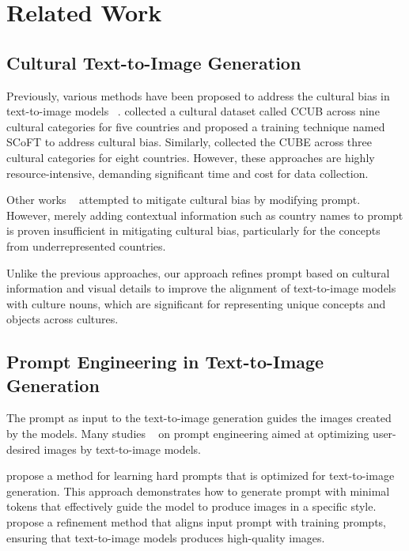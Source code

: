 \section{Related Work}
\subsection{Cultural Text-to-Image Generation}
Previously, various methods have been proposed to address the cultural bias in text-to-image models ~\citep{cho2023dall,friedrich2023fair,luccioni2024stable}. \citet{liu2024scoft} collected a cultural dataset called CCUB across nine cultural categories for five countries and proposed a training technique named SCoFT to address cultural bias. Similarly, \citet{kannen2024beyond} collected the CUBE across three cultural categories for eight countries. However, these approaches are highly resource-intensive, demanding significant time and cost for data collection.

Other works ~\citep{basu2023inspecting,bansal2022well} attempted to mitigate cultural bias by modifying prompt. However, merely adding contextual information such as country names to prompt is proven insufficient in mitigating cultural bias, particularly for the concepts from underrepresented countries.

Unlike the previous approaches, our approach refines prompt based on cultural information and visual details to improve the alignment of text-to-image models with culture nouns, which are significant for representing unique concepts and objects across cultures.

\subsection{Prompt Engineering in Text-to-Image Generation}
The prompt as input to the text-to-image generation guides the images created by the models. Many studies ~\citep{oppenlaender2023taxonomy,liu2022design,brade2023promptify} on prompt engineering aimed at optimizing user-desired images by text-to-image models.

\citet{wen2024hard} propose a method for learning hard prompts that is optimized for text-to-image generation. This approach demonstrates how to generate prompt with minimal tokens that effectively guide the model to produce images in a specific style. \citet{yao2024promptcot} propose a refinement method that aligns input prompt with training prompts, ensuring that text-to-image models produces high-quality images.


